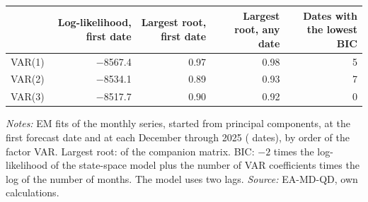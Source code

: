 \begin{threeparttable}
\begin{tabular}{lrrrr}
\toprule
 & Log-likelihood, first date & Largest root, first date & Largest root, any date & Dates with the lowest BIC \\
\midrule
VAR(1) & $-$8567.4 & 0.97 & 0.98 & 5 \\
VAR(2) & $-$8534.1 & 0.89 & 0.93 & 7 \\
VAR(3) & $-$8517.7 & 0.90 & 0.92 & 0 \\
\bottomrule
\end{tabular}
\begin{tablenotes}[flushleft]\footnotesize
\item \textit{Notes:} EM fits of the \NSeriesMonthly{} monthly series, started from principal components, at the first forecast date and at each December through 2025 (\NLagDates{} dates), by order of the factor VAR. Largest root: of the companion matrix. BIC: $-2$ times the log-likelihood of the state-space model plus the number of VAR coefficients times the log of the number of months. The model uses two lags. \textit{Source:} EA-MD-QD, own calculations.
\end{tablenotes}
\end{threeparttable}
